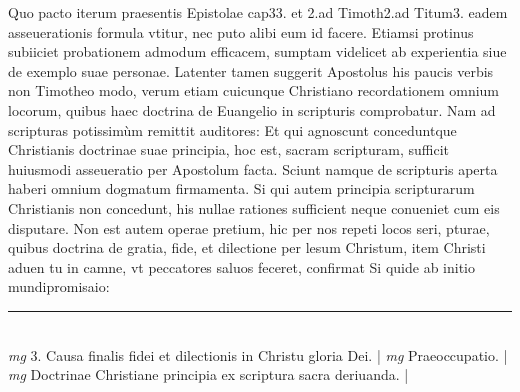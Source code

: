 \documentclass{article}
\begin{document}
\begin{pages}
Quo pacto iterum praesentis Epistolae cap33. et 2.ad Timoth2.ad Titum3. eadem asseuerationis formula vtitur, nec puto alibi eum id facere. Etiamsi protinus subiiciet probationem admodum efficacem, sumptam videlicet ab experientia siue de exemplo suae personae. Latenter tamen suggerit Apostolus his paucis verbis non Timotheo modo, verum etiam cuicunque  Christiano recordationem omnium locorum, quibus haec doctrina de Euangelio in scripturis comprobatur. Nam ad scripturas potissimùm remittit auditores: Et qui agnoscunt conceduntque Christianis doctrinae suae principia, hoc est, sacram scripturam, sufficit huiusmodi asseueratio per Apostolum facta. Sciunt namque de scripturis aperta haberi omnium dogmatum firmamenta. Si qui autem principia scripturarum Christianis non concedunt, his nullae rationes sufficient neque conueniet cum eis disputare. Non est autem operae pretium, hic per nos repeti locos seri, pturae, quibus  doctrina de gratia, fide, et dilectione per lesum Christum, item Christi aduen tu in camne, vt peccatores saluos feceret, confirmat Si quide ab initio mundipromisaio:  \pend
\vspace{0.5cm}\noindent
\vspace{0.2cm}\rule{1cm}{0.2pt}\\ 
\hspace{0.2cm}\textit{mg}
\footnotesize 3. Causa finalis fidei et dilectionis in Christu gloria Dei. 
\normalsize| 
\hspace{0.2cm}\textit{mg}
\footnotesize Praeoccupatio. 
\normalsize| 
\hspace{0.2cm}\textit{mg}
\footnotesize Doctrinae Christiane principia ex scriptura sacra deriuanda. 
\normalsize| 

\end{pages}
\end{document}

